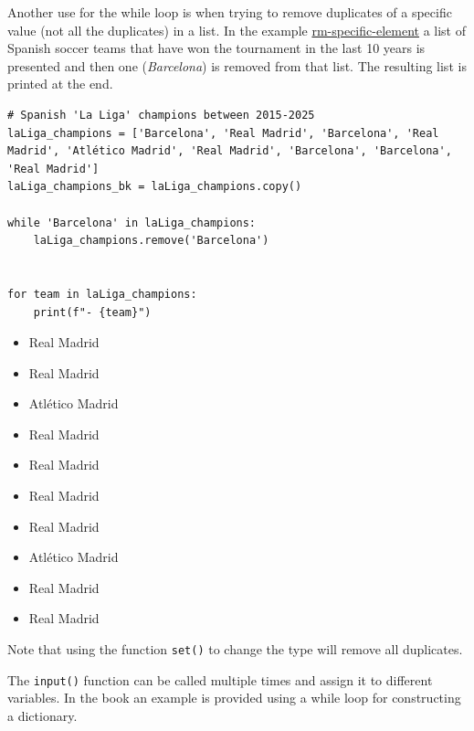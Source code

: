 \documentclass[10pt]{book}
\begin{document}
Another use for the while loop is when trying to remove duplicates of a specific value (not all the duplicates) in a list. In the example \hyperref[org47a8f56]{rm-specific-element} a list of Spanish soccer teams that have won the tournament in the last 10 years is presented and then one (\emph{Barcelona}) is removed from that list. The resulting list is printed at the end.

\label{orgb72828e}
\begin{verbatim}
# Spanish 'La Liga' champions between 2015-2025
laLiga_champions = ['Barcelona', 'Real Madrid', 'Barcelona', 'Real Madrid', 'Atlético Madrid', 'Real Madrid', 'Barcelona', 'Barcelona', 'Real Madrid']
laLiga_champions_bk = laLiga_champions.copy()

while 'Barcelona' in laLiga_champions:
    laLiga_champions.remove('Barcelona')


for team in laLiga_champions:
    print(f"- {team}")
\end{verbatim}

\label{org47a8f56}
\begin{itemize}
\item Real Madrid
\item Real Madrid
\item Atlético Madrid
\item Real Madrid
\item Real Madrid
\end{itemize}

\label{orgd00c195}
\begin{itemize}
\item Real Madrid
\item Real Madrid
\item Atlético Madrid
\item Real Madrid
\item Real Madrid
\end{itemize}

Note that using the function \texttt{set()} to change the type will remove all duplicates.

The \texttt{input()} function can be called multiple times and assign it to different variables. In the book an example is provided using a while loop for constructing a dictionary.
\end{document}
